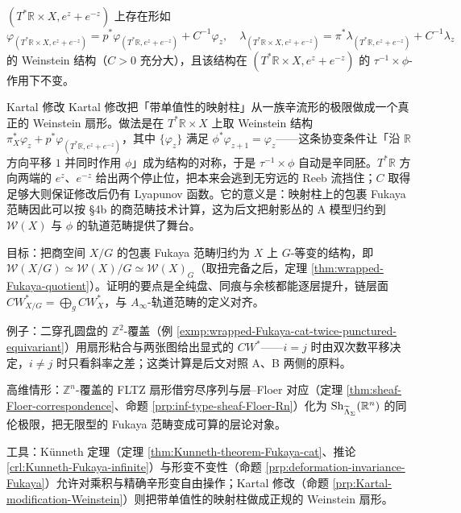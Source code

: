 \begin{prp}\label{prp:Kartal-modification-Weinstein}
    $(T^{\ast}\mathbb{R}\times X,e^z+e^{-z})$ 上存在形如
\[
        \varphi_{(T^{\ast}\mathbb{R}\times X,e^z+e^{-z})} =p^{\ast}\varphi_{(T^{\ast}\mathbb{R},e^z+e^{-z})}+C^{-1}\varphi_z,\quad \lambda_{(T^{\ast}\mathbb{R}\times X,e^z+e^{-z})}=\pi^{\ast}\lambda_{(T^{\ast}\mathbb{R},e^z+e^{-z})} +C^{-1}\lambda_z
    \]
的 Weinstein 结构（$C>0$ 充分大），且该结构在 $(T^{\ast}\mathbb{R}\times X,e^z+e^{-z})$ 的 $\tau^{-1}\times\phi$-作用下不变。
\end{prp}

\begin{conceptbox}{Kartal 修改}
    Kartal 修改把「带单值性的映射柱」从一族辛流形的极限做成一个真正的 Weinstein 扇形。做法是在 $T^{\ast}\mathbb{R}\times X$ 上取 Weinstein 结构 $\pi_X^{\ast}\varphi_z+p^{\ast}\varphi_{(T^{\ast}\mathbb{R},e^z+e^{-z})}$，其中 $\{\varphi_z\}$ 满足 $\phi^{\ast}\varphi_{z+1}=\varphi_z$——这条协变条件让「沿 $\mathbb{R}$ 方向平移 $1$ 并同时作用 $\phi$」成为结构的对称，于是 $\tau^{-1}\times\phi$ 自动是辛同胚。$T^{\ast}\mathbb{R}$ 方向两端的 $e^z$、$e^{-z}$ 给出两个停止位，把本来会逃到无穷远的 Reeb 流挡住；$C$ 取得足够大则保证修改后仍有 Lyapunov 函数。它的意义是：映射柱上的包裹 Fukaya 范畴因此可以按 §4b 的商范畴技术计算，这为后文把射影丛的 A 模型归约到 $\mathcal{W}(X)$ 与 $\phi$ 的轨道范畴提供了舞台。
\par\smallskip{}
\end{conceptbox}

\begin{keytakeaways}
    \item 目标：把商空间 $X/G$ 的包裹 Fukaya 范畴归约为 $X$ 上 $G$-等变的结构，即 $\mathcal{W}(X/G)\simeq\mathcal{W}(X)/G\simeq\mathcal{W}(X)_G$（取扭完备之后，定理 \ref{thm:wrapped-Fukaya-quotient}）。证明的要点是全纯盘、同痕与余核都能逐层提升，链层面 $CW^{\ast}_{X/G}=\bigoplus_{g}CW^{\ast}_X$，与 $A_{\infty}$-轨道范畴的定义对齐。
    \item 例子：二穿孔圆盘的 $\mathbb{Z}^2$-覆盖（例 \ref{exmp:wrapped-Fukaya-cat-twice-punctured-equivariant}）用扇形粘合与两张图给出显式的 $CW^{\ast}$——$i=j$ 时由双次数平移决定，$i\neq j$ 时只看斜率之差；这类计算是后文对照 A、B 两侧的原料。
    \item 高维情形：$\mathbb{Z}^n$-覆盖的 FLTZ 扇形借穷尽序列与层--Floer 对应（定理 \ref{thm:sheaf-Floer-correspondence}、命题 \ref{prp:inf-type-sheaf-Floer-Rn}）化为 $\operatorname{Sh}_{\widetilde{\Lambda}_{\Sigma}}(\mathbb{R}^n)$ 的同伦极限，把无限型的 Fukaya 范畴变成可算的层论对象。
    \item 工具：K\"unneth 定理（定理 \ref{thm:Kunneth-theorem-Fukaya-cat}、推论 \ref{crl:Kunneth-Fukaya-infinite}）与形变不变性（命题 \ref{prp:deformation-invariance-Fukaya}）允许对乘积与精确辛形变自由操作；Kartal 修改（命题 \ref{prp:Kartal-modification-Weinstein}）则把带单值性的映射柱做成正规的 Weinstein 扇形。
\end{keytakeaways}
